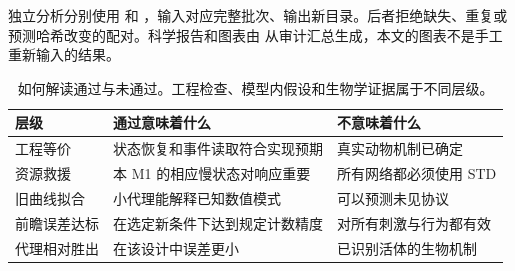 \documentclass[UTF8,a4paper,zihao=-4,fontset=none]{ctexart}
\begin{document}
独立分析分别使用  和 ，输入对应完整批次、输出新目录。后者拒绝缺失、重复或预测哈希改变的配对。科学报告和图表由  从审计汇总生成，本文的图表不是手工重新输入的结果。

\begin{table}[!htbp]
\centering\small
\caption{如何解读通过与未通过。工程检查、模型内假设和生物学证据属于不同层级。}
\begin{tabularx}{\linewidth}{p{3cm}YY}
\toprule
层级 & 通过意味着什么 & 不意味着什么\\\midrule
工程等价 & 状态恢复和事件读取符合实现预期 & 真实动物机制已确定\\
资源救援 & 本 M1 的相应慢状态对响应重要 & 所有网络都必须使用 STD\\
旧曲线拟合 & 小代理能解释已知数值模式 & 可以预测未见协议\\
前瞻误差达标 & 在选定新条件下达到规定计数精度 & 对所有刺激与行为都有效\\
代理相对胜出 & 在该设计中误差更小 & 已识别活体的生物机制\\
\bottomrule
\end{tabularx}
\end{table}
\end{document}
